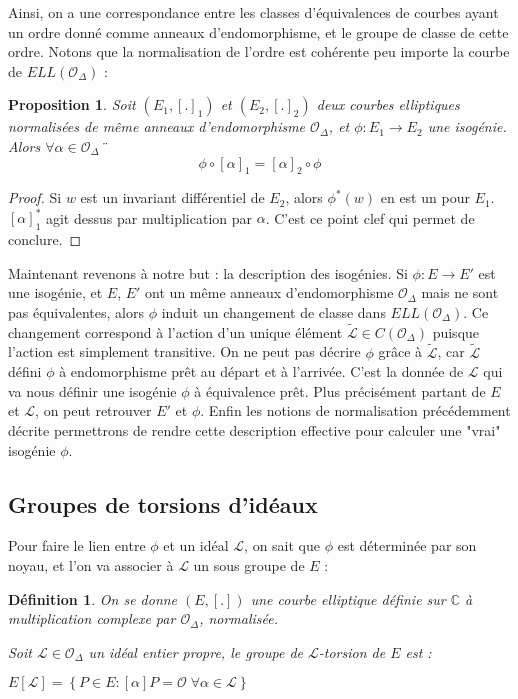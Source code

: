 \documentclass{article}
\newcommand{\C}[0]{\mathbb{C}}
\newcommand{\OR}[0]{\mathcal{O}}
\newcommand{\LR}[0]{\mathcal{L}}
\newcommand{\CL}[0]{\tilde{\LR}}
\newtheorem{Prop}[The]{Proposition}
\newtheorem{Def}[The]{Définition}
\begin{document}
Ainsi, on a une correspondance entre les classes d'équivalences de courbes ayant un ordre donné comme anneaux d'endomorphisme, et le groupe de classe de cette ordre. Notons que la normalisation de l'ordre est cohérente peu importe la courbe de $ELL(\OR_{\Delta})$ :
	 
\begin{Prop}
	Soit $(E_1,[.]_1)$ et $(E_2,[.]_2)$ deux courbes elliptiques normalisées de même anneaux d'endomorphisme $\OR_{\Delta}$, et $\phi : E_1 \rightarrow E_2$ une isogénie. Alors $\forall\alpha\in\OR_{\Delta}$¨
	\begin{equation*}
		\phi\circ[\alpha]_1 = [\alpha]_2\circ\phi
	\end{equation*}
\end{Prop}
	 
\begin{proof}
	Si $w$ est un invariant différentiel de $E_2$, alors $\phi^{*}(w)$ en est un pour $E_1$. $[\alpha]_{1}^{*}$ agit dessus par multiplication par $\alpha$. C'est ce point clef qui permet de conclure. 
\end{proof}
	 
Maintenant revenons à notre but : la description des isogénies. Si $\phi : E \rightarrow E'$ est une isogénie, et $E$, $E'$ ont un même anneaux d'endomorphisme $\OR_{\Delta}$ mais ne sont pas équivalentes, alors $\phi$ induit un changement de classe dans $ELL(\OR_{\Delta})$. Ce changement correspond à l'action d'un unique élément $\CL\in C(\OR_{\Delta})$ puisque l'action est simplement transitive. On ne peut pas décrire $\phi$ grâce à $\CL$, car $\CL$ défini $\phi$ à endomorphisme prêt au départ et à l'arrivée. C'est la donnée de $\LR$ qui va nous définir une isogénie $\phi$ à équivalence prêt. Plus précisément partant de $E$ et $\LR$, on peut retrouver $E'$ et $\phi$. Enfin les notions de normalisation précédemment décrite permettrons de rendre cette description effective pour calculer une "vrai" isogénie $\phi$. 

\subsection{Groupes de torsions d'idéaux}

Pour faire le lien entre $\phi$ et un idéal $\LR$, on sait que $\phi$ est déterminée par son noyau, et l'on va associer à $\LR$ un sous groupe de $E$ :

\begin{Def}
	
	On se donne $(E,[.])$ une courbe elliptique définie sur $\C$ à multiplication complexe par $\OR_{\Delta}$, normalisée.
	
	Soit $\LR\in\OR_{\Delta}$ un idéal entier propre, le groupe de $\LR$-torsion de $E$ est :
	
	$E\left[ \LR\right] = \left\lbrace P\in E : \left[ \alpha\right] P = \OR \; \forall\alpha\in\LR \right\rbrace $
	
\end{Def}
\end{document}
